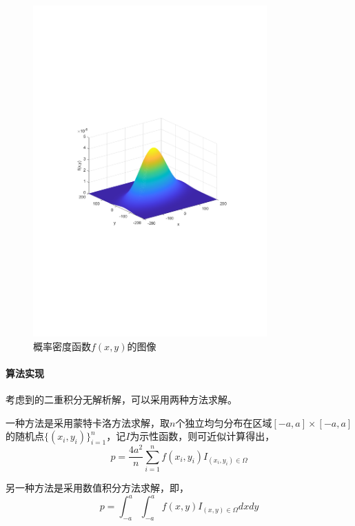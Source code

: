 \begin{figure}[H]
    \centering
    \includegraphics[width=0.8\textwidth,trim={3.09cm 9.295cm 3.09cm 9.295cm},clip]{fig/ex5_pdf.pdf}
    \caption{概率密度函数$f(x,y)$的图像}
    \label{fig:ex5_pdf}
\end{figure}

\paragraph{算法实现} 考虑到的二重积分无解析解，可以采用两种方法求解。

一种方法是采用蒙特卡洛方法求解，取$n$个独立均匀分布在区域$[-a,a]\times [-a,a]$的随机点$\{(x_i,y_i)\}_{i=1}^n$，记$I$为示性函数，则可近似计算得出，
\begin{equation}
    p = \frac{4a^2}{n} \sum_{i=1}^n f(x_i, y_i) I_{(x_i, y_i) \in \Omega}
\end{equation}

另一种方法是采用数值积分方法求解，即，
\begin{equation}
    p = \int_{-a}^a \int_{-a}^a f(x,y) I_{(x, y) \in \Omega} dxdy
\end{equation}


